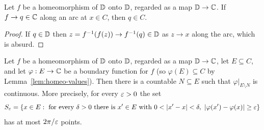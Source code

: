 \begin{lemma}\label{lem:homeo-values}
Let $f$ be a homeomorphism of $\mathbb{D}$ onto $\mathbb{D}$, regarded as a map $\mathbb{D}\to\mathbb{C}$. If $f\to q\in\mathbb{C}$ along an arc at
$x\in C$, then $q\in C$.
\end{lemma}
\begin{proof}
If $q\in\mathbb{D}$ then $z=f^{-1}(f(z))\to f^{-1}(q)\in\mathbb{D}$ as $z\to x$ along the arc, which is absurd.
\end{proof}

\begin{theorem}\label{thm:homeo}
Let $f$ be a homeomorphism of $\mathbb{D}$ onto $\mathbb{D}$, regarded as a map $\mathbb{D}\to\mathbb{C}$, let $E\subseteq C$, and let $\varphi:E\to\mathbb{C}$ be a
boundary function for $f$ (so $\varphi(E)\subseteq C$ by Lemma~\ref{lem:homeo-values}). Then there is a countable $N\subseteq E$ such that $\varphi|_{E\setminus N}$ is continuous. More precisely,
for every $\varepsilon>0$ the set
\[
S_\varepsilon=\{x\in E:\ \text{for every }\delta>0\text{ there is }x'\in E\text{ with }0<\lvert x'-x\rvert<\delta,\
\lvert \varphi(x')-\varphi(x)\rvert\ge\varepsilon\}
\]
has at most $2\pi/\varepsilon$ points.
\end{theorem}
